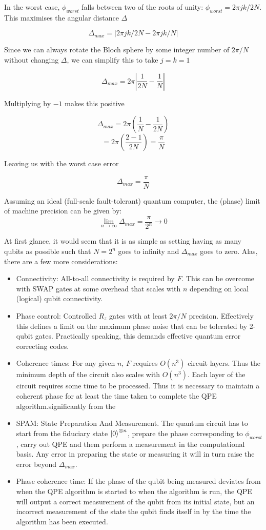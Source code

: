 \documentclass{book}
\begin{document}
In the worst case, $\phi_{worst}$ falls between two of the roots of unity: $\phi_{worst} = 2\pi jk/2N$. This maximises the angular distance $\Delta$

$$ \Delta_{max} = | 2\pi jk/2N - 2\pi jk/N | $$

Since we can always rotate the Bloch sphere by some integer number of $ 2\pi/N $ without changing $ \Delta $, we can simplify this to take $j = k = 1$

$$ \Delta_{max} = 2\pi \left| \frac{1}{2N} - \frac{1}{N} \right| $$

Multiplying by $-1$ makes this positive

$$ \Delta_{max} = 2\pi\left( \frac{1}{N} - \frac{1}{2N} \right) $$
$$ = 2\pi\left(  \frac{ 2 -1}{2N}   \right) = \frac{\pi}{N} $$

Leaving us with the worst case error 

$$ \Delta_{max} = \frac{\pi}{N} $$

Assuming an ideal (full-scale fault-tolerant) quantum computer, the (phase) limit of machine precision can be given by:
$$
\lim_{n \rightarrow \infty} \Delta_{max} = \frac{\pi}{2^n} \rightarrow 0
$$

At first glance, it would seem that it is as simple as setting having as many qubits as possible such that $N = 2^n$ goes to infinity and $\Delta_{max}$ goes to zero. Alas, there are a few more considerations:

\begin{itemize}
   \item Connectivity: All-to-all connectivity is required by $F$. This can be overcome with SWAP gates at some overhead that scales with $n$ depending on local (logical) qubit connectivity.
   \item Phase control: Controlled $R_z$ gates with at least $2\pi/N$ precision. Effectively this defines a limit on the maximum phase noise that can be tolerated by 2-qubit gates. Practically speaking, this demands effective quantum error correcting codes.
   \item Coherence times: For any given $n$, $F$ requires $O(n^3)$ circuit layers. Thus the minimum depth of the circuit also scales with $O(n^3)$. Each layer of the circuit requires some time to be processed. Thus it is necessary to maintain a coherent phase for at least the time taken to complete the QPE algorithm.significantly from the  
   \item SPAM: State Preparation And Measurement. The quantum circuit has to start from the fiduciary state $\ket{0}^{\otimes n}$, prepare the phase corresponding to $\phi_{worst}$, carry out QPE and them perform a measurement in the computational basis. Any error in preparing the state or measuring it will in turn raise the error beyond $\Delta_{max}$.
   \item Phase coherence time: If the phase of the qubit being measured deviates from when the QPE algorithm is started to when the algorithm is run, the QPE will output a correct measurement of the qubit from its initial state, but an incorrect measurement of the state the qubit finds itself in by the time the algorithm has been executed. 
\end{itemize}
\end{document}
